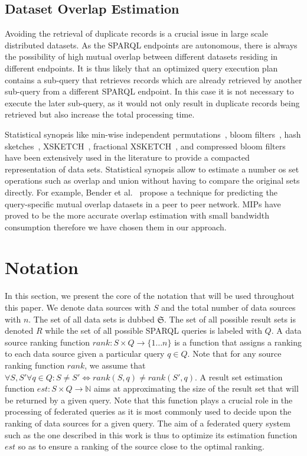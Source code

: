 \documentclass{sig-alternate}  %
\begin{document}
\subsection{Dataset Overlap Estimation}
Avoiding the retrieval of duplicate records is a crucial issue in large scale distributed datasets. As the SPARQL endpoints are autonomous, there is always the possibility of high mutual overlap between different datasets residing in different endpoints. It is thus likely that an optimized query execution plan contains a sub-query that retrieves records which are already retrieved by another sub-query from a different SPARQL endpoint. In this case it is not necessary to execute the later sub-query, as it would not only result in duplicate records being retrieved but also increase the total processing time.

Statistical synopsis like min-wise independent permutations~\cite{key-9}, bloom filters~\cite{key-10}, hash sketches~\cite{key-36}, XSKETCH~\cite{key-37}, fractional XSKETCH~\cite{key-38}, and compressed bloom filters~\cite{key-11} have been extensively used in the literature to provide a compacted representation of data sets. Statistical synopsis allow to estimate a number os set operations such as overlap and union without having to compare the original sets directly. For example, Bender et al.~\cite{key-12} propose a technique for predicting the query-specific mutual overlap datasets in a peer to peer network. MIPs have proved to be the more accurate overlap estimation with small bandwidth consumption\cite{key-9} therefore we have chosen them in our approach.  

\section{Notation}
In this section, we present the core of the notation that will be used throughout this paper.
We denote data sources with $S$ and the total number of data sources with $n$. 
The set of all data sets is dubbed $\mathfrak{S}$.
The set of all possible result sets is denoted $R$ while the set of all possible SPARQL queries is labeled with $Q$. 
A data source ranking function $rank: S \times Q \rightarrow \{1 \ldots n\}$ is a function that assigns a ranking to each data source given a particular query $q \in Q$.
Note that for any source ranking function $rank$, we assume that $\forall S, S' \forall q \in Q : S  \neq S' \Longleftrightarrow rank(S, q) \neq rank (S', q)$.
A result set estimation function $est: S \times Q \rightarrow \mathbb{N}$ aims at approximating the size of the result set that will be returned by a given query.
Note that this function plays a crucial role in the processing of federated queries as it is most commonly used to decide upon the ranking of data sources for a given query.
The aim of a federated query system such as the one described in this work is thus to optimize its estimation function $est$ so as to ensure a ranking of the source close to the optimal ranking. %
\end{document}
